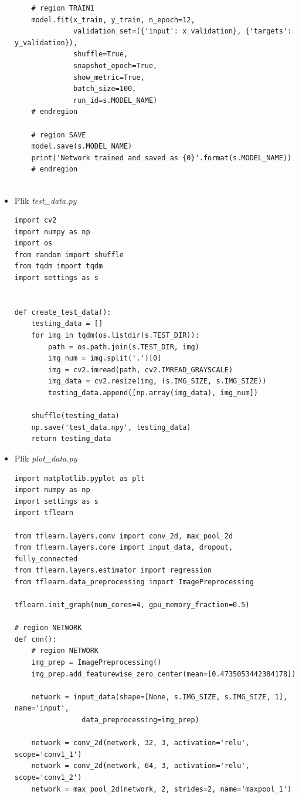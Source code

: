 \documentclass[12pt,a4paper]{article}
\begin{document}
\begin{itemize}
{\begin{verbatim}
    # region TRAIN1
    model.fit(x_train, y_train, n_epoch=12,
              validation_set=({'input': x_validation}, {'targets': y_validation}),
              shuffle=True,
              snapshot_epoch=True,
              show_metric=True,
              batch_size=100,
              run_id=s.MODEL_NAME)
    # endregion

    # region SAVE
    model.save(s.MODEL_NAME)
    print('Network trained and saved as {0}'.format(s.MODEL_NAME))
    # endregion


        \end{verbatim}
    }
        \item Plik \textit{test\_data.py}
	{\fontsize{9}{10}\selectfont
    	\begin{verbatim}
import cv2
import numpy as np
import os
from random import shuffle
from tqdm import tqdm
import settings as s


def create_test_data():
    testing_data = []
    for img in tqdm(os.listdir(s.TEST_DIR)):
        path = os.path.join(s.TEST_DIR, img)
        img_num = img.split('.')[0]
        img = cv2.imread(path, cv2.IMREAD_GRAYSCALE)
        img_data = cv2.resize(img, (s.IMG_SIZE, s.IMG_SIZE))
        testing_data.append([np.array(img_data), img_num])

    shuffle(testing_data)
    np.save('test_data.npy', testing_data)
    return testing_data
        \end{verbatim}
    }
        \item Plik \textit{plot\_data.py}
	{\fontsize{9}{10}\selectfont
    	\begin{verbatim}
import matplotlib.pyplot as plt
import numpy as np
import settings as s
import tflearn

from tflearn.layers.conv import conv_2d, max_pool_2d
from tflearn.layers.core import input_data, dropout, fully_connected
from tflearn.layers.estimator import regression
from tflearn.data_preprocessing import ImagePreprocessing

tflearn.init_graph(num_cores=4, gpu_memory_fraction=0.5)

# region NETWORK
def cnn():
    # region NETWORK
    img_prep = ImagePreprocessing()
    img_prep.add_featurewise_zero_center(mean=[0.4735053442384178])

    network = input_data(shape=[None, s.IMG_SIZE, s.IMG_SIZE, 1], name='input',
                data_preprocessing=img_prep)

    network = conv_2d(network, 32, 3, activation='relu', scope='conv1_1')
    network = conv_2d(network, 64, 3, activation='relu', scope='conv1_2')
    network = max_pool_2d(network, 2, strides=2, name='maxpool_1')


\end{verbatim}}
\end{itemize}
\end{document}

